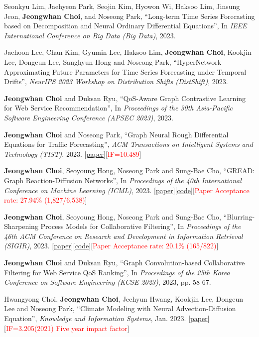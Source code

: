 \documentclass[10pt]{article}
\newenvironment{changemargin}[2]{
  \begin{list}{}{
    \setlength{\topsep}{0pt}
    \setlength{\leftmargin}{#1}
    \setlength{\rightmargin}{#2}
    \setlength{\listparindent}{\parindent}
    \setlength{\itemindent}{\parindent}
    \setlength{\parsep}{\parskip}
  }
  \item[]}{\end{list}
}
\newcommand{\presentation}[2]{
	{#1} \hfill \emph{#2}\\ \bigskip
}
\newcommand{\RED}[1]{\textcolor{red}{#1}}
\newenvironment{body} {
	\vspace*{-16pt}
	\begin{changemargin}{-0.25in}{-0.5in}
  }
	{\end{changemargin}
}
\begin{document}
\begin{body}
	\vspace{14pt}
\presentation{
 Seonkyu Lim, Jaehyeon Park, Seojin Kim, Hyowon Wi, Haksoo Lim, Jinsung Jeon, \textbf{Jeongwhan Choi}, and Noseong Park, ``Long-term Time Series Forecasting based on Decomposition and Neural Ordinary Differential Equations'', In \emph{IEEE International Conference on Big Data (Big Data)}, 2023.}{}

\presentation{
Jaehoon Lee, Chan Kim, Gyumin Lee, Haksoo Lim, \textbf{Jeongwhan Choi}, Kookjin Lee, Dongeun Lee, Sanghyun Hong and Noseong Park, ``HyperNetwork Approximating Future Parameters for Time Series Forecasting under Temporal Drifts'', \emph{NeurIPS 2023 Workshop on Distribution Shifts (DistShift)}, 2023.}{}

\presentation{
\textbf{Jeongwhan Choi} and Duksan Ryu, ``QoS-Aware Graph Contrastive Learning for Web Service Recommendation'', In \emph{Proceedings of the 30th Asia-Pacific Software Engineering Conference (APSEC 2023)}, 2023.}{}
\presentation{
\textbf{Jeongwhan Choi} and Noseong Park, ``Graph Neural Rough Differential Equations for Traffic Forecasting'', \emph{ACM Transactions on Intelligent Systems and Technology (TIST)}, 2023. [\href{https://dl.acm.org/doi/abs/10.1145/3604808}{paper}][\RED{IF=10.489}]}{}
\presentation{
\textbf{Jeongwhan Choi}, Seoyoung Hong, Noseong Park and Sung-Bae Cho, ``GREAD: Graph Reaction-Diffusion Networks'', In \emph{Proceedings of the 40th International Conference on Machine Learning (ICML)}, 2023. [\href{http://proceedings.mlr.press/v202/choi23a}{paper}][\href{https://github.com/jeongwhanchoi/GREAD}{code}][\RED{Paper Acceptance rate: 27.94\% (1,827/6,538)}]}{}
\presentation{
\textbf{Jeongwhan Choi}, Seoyoung Hong, Noseong Park and Sung-Bae Cho, ``Blurring-Sharpening Process Models for Collaborative Filtering'', In \emph{Proceedings of the 46th ACM Conference on Research and Development in Information Retrieval (SIGIR)}, 2023. [\href{https://arxiv.org/abs/2211.09324}{paper}][\href{https://github.com/jeongwhanchoi/bspm}{code}][\RED{Paper Acceptance rate: 20.1\% (165/822)}]}{}
\presentation{
\textbf{Jeongwhan Choi} and Duksan Ryu, ``Graph Convolution-based Collaborative Filtering for Web Service QoS Ranking'', In \emph{Proceedings of the 25th Korea Conference on Software Engineering (KCSE 2023)}, 2023, pp. 58-67.}{}
\presentation{
Hwangyong Choi, \textbf{Jeongwhan Choi}, Jeehyun Hwang, Kookjin Lee, Dongeun Lee and Noseong Park, ``Climate Modeling with Neural Advection-Diffusion Equation'', \emph{Knowledge and Information Systems}, Jan. 2023. [\href{https://doi.org/10.1007/s10115-023-01829-2}{paper}] [\RED{IF=3.205(2021) Five year impact factor}]}{}


\end{body}
\end{document}
